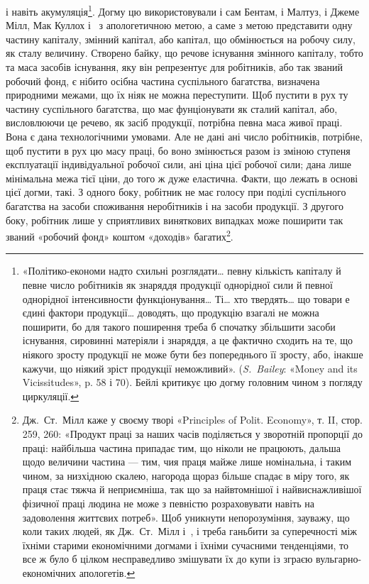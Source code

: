 \parcont{}  %
і навіть акумуляція\footnote{
«Політико-економи надто схильні розглядати\dots{} певну кількість
капіталу й певне число робітників як знаряддя продукції однорідної
сили й певної однорідної інтенсивности функціонування\dots{} Ті\dots{}
хто твердять\dots{} що товари е єдині фактори продукції\dots{} доводять, що
продукцію взагалі не можна поширити, бо для такого поширення треба б спочатку
збільшити засоби існування, сировинні матеріяли і знаряддя, а це фактично
сходить на те, що ніякого зросту продукції не може бути без попереднього
її зросту, або, інакше кажучи, що ніякий зріст продукції неможливий».
(\emph{S.~Bailey}: «Money and its Vicissitudes», p. 58 і 70). Бейлі
критикує цю догму головним чином з погляду циркуляції.
}. Догму цю використовували і сам Бентам,
і Малтуз, і Джеме Мілл, Мак Куллох і~ з апологетичною
метою, а саме з метою представити одну частину капіталу, змінний
капітал, або капітал, що обмінюється на робочу силу, як
сталу величину. Створено байку, що речове існування змінного
капіталу, тобто та маса засобів існування, яку він репрезентує
для робітників, або так званий робочий фонд, є нібито осібна
частина суспільного багатства, визначена природними межами,
що їх ніяк не можна переступити. Щоб пустити в рух ту частину
суспільного багатства, що має фунціонувати як сталий капітал,
або, висловлюючи це речево, як засіб продукції, потрібна
певна маса живої праці. Вона є дана технологічними умовами. Але
не дані ані число робітників, потрібне, щоб пустити в рух цю
масу праці, бо воно змінюється разом із зміною ступеня експлуатації
індивідуальної робочої сили, ані ціна цієї робочої сили;
дана лише мінімальна межа тієї ціни, до того ж дуже еластична.
Факти, що лежать в основі цієї догми, такі. З одного боку, робітник
не має голосу при поділі суспільного багатства на засоби
споживання неробітників і на засоби продукції. З другого
боку, робітник лише у сприятливих виняткових випадках може
поширити так званий «робочий фонд» коштом «доходів» багатих\footnote{
Дж.~Ст.~Мілл каже у своєму творі «Principles of Polit. Economy»,
т. II, стор. 259, 260: «Продукт праці за наших часів поділяється у зворотній
пропорції до праці: найбільша частина припадає тим, що ніколи
не працюють, дальша щодо величини частина — тим, чия праця майже
лише номінальна, і таким чином, за низхідною скалею, нагорода щораз
більше спадає в міру того, як праця стає тяжча й неприємніша, так що
за найвтомнішої і найвиснажливішої фізичної праці людина не може з
певністю розраховувати навіть на задоволення життєвих потреб». Щоб
уникнути непорозуміння, зауважу, що коли таких людей, як Дж.~Ст.~Мілл і~, і треба ганьбити за суперечності між їхніми старими економічними
догмами і їхніми сучасними тенденціями, то все ж було б цілком
несправедливо змішувати їх до купи із зграєю вульгарно-економічних
апологетів.
}.
